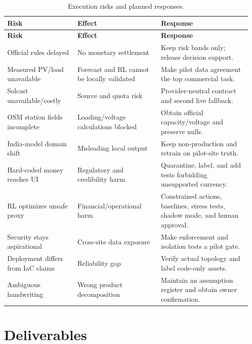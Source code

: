\documentclass[11pt,a4paper]{article}
\begin{document}
\begin{footnotesize}
\begin{longtable}{@{}p{3.4cm}p{4.1cm}p{7.0cm}@{}}
\caption{Execution risks and planned responses.}\label{tab:risks}\\
\toprule
\textbf{Risk} & \textbf{Effect} & \textbf{Response}\\
\midrule
\endfirsthead
\toprule
\textbf{Risk} & \textbf{Effect} & \textbf{Response}\\
\midrule
\endhead
\bottomrule
\endfoot
Official rules delayed & No monetary settlement & Keep risk bands only; release decision support.\\
Measured PV/load unavailable & Forecast and RL cannot be locally validated &
Make pilot data agreement the top commercial task.\\
Solcast unavailable/costly & Source and quota risk &
Provider-neutral contract and second live fallback.\\
OSM station fields incomplete & Loading/voltage calculations blocked &
Obtain official capacity/voltage and preserve nulls.\\
India-model domain shift & Misleading local output &
Keep non-production and retrain on pilot-site truth.\\
Hard-coded money reaches UI & Regulatory and credibility harm &
Quarantine, label, and add tests forbidding unsupported currency.\\
RL optimizes unsafe proxy & Financial/operational harm &
Constrained actions, baselines, stress tests, shadow mode, and human approval.\\
Security stays aspirational & Cross-site data exposure &
Make enforcement and isolation tests a pilot gate.\\
Deployment differs from IaC claims & Reliability gap &
Verify actual topology and label code-only assets.\\
Ambiguous handwriting & Wrong product decomposition &
Maintain an assumption register and obtain owner confirmation.\\
\end{longtable}
\end{footnotesize}

\section{Deliverables}
\end{document}
